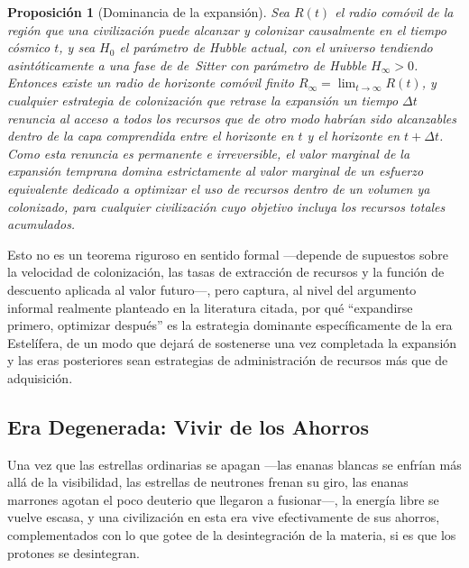 \documentclass[11pt]{article}
\newtheorem{proposition}{Proposición}
\begin{document}
\begin{proposition}[Dominancia de la expansión]
\label{prop:expansion}
Sea $R(t)$ el radio comóvil de la región que una civilización puede alcanzar y colonizar causalmente en el tiempo cósmico $t$, y sea $H_0$ el parámetro de Hubble actual, con el universo tendiendo asintóticamente a una fase de de~Sitter con parámetro de Hubble $H_\infty > 0$. Entonces existe un radio de horizonte comóvil finito $R_\infty = \lim_{t\to\infty} R(t)$, y cualquier estrategia de colonización que retrase la expansión un tiempo $\Delta t$ renuncia al acceso a todos los recursos que de otro modo habrían sido alcanzables dentro de la capa comprendida entre el horizonte en $t$ y el horizonte en $t + \Delta t$. Como esta renuncia es permanente e irreversible, el valor marginal de la expansión temprana domina estrictamente al valor marginal de un esfuerzo equivalente dedicado a optimizar el uso de recursos dentro de un volumen ya colonizado, para cualquier civilización cuyo objetivo incluya los recursos totales acumulados.
\end{proposition}

Esto no es un teorema riguroso en sentido formal —depende de supuestos sobre la velocidad de colonización, las tasas de extracción de recursos y la función de descuento aplicada al valor futuro—, pero captura, al nivel del argumento informal realmente planteado en la literatura citada, por qué ``expandirse primero, optimizar después'' es la estrategia dominante específicamente de la era Estelífera, de un modo que dejará de sostenerse una vez completada la expansión y las eras posteriores sean estrategias de administración de recursos más que de adquisición.

\subsection{Era Degenerada: Vivir de los Ahorros}
\label{sec:degenerate}

Una vez que las estrellas ordinarias se apagan —las enanas blancas se enfrían más allá de la visibilidad, las estrellas de neutrones frenan su giro, las enanas marrones agotan el poco deuterio que llegaron a fusionar—, la energía libre se vuelve escasa, y una civilización en esta era vive efectivamente de sus ahorros, complementados con lo que gotee de la desintegración de la materia, si es que los protones se desintegran.
\end{document}
